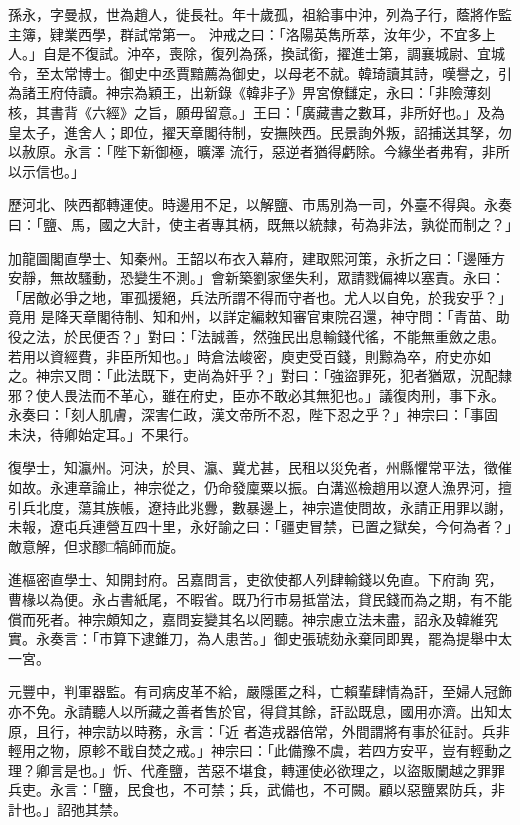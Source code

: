 \begin{pinyinscope}
 孫永，字曼叔，世為趙人，徙長社。年十歲孤，祖給事中沖，列為子行，蔭將作監主簿，肄業西學，群試常第一。
 沖戒之曰：「洛陽英雋所萃，汝年少，不宜多上人。」自是不復試。沖卒，喪除，復列為孫，換試銜，擢進士第，調襄城尉、宜城令，至太常博士。御史中丞賈黯薦為御史，以母老不就。韓琦讀其詩，嘆譽之，引為諸王府侍讀。神宗為穎王，出新錄《韓非子》畀宮僚讎定，永曰：「非險薄刻核，其書背《六經》之旨，願毋留意。」王曰：「廣藏書之數耳，非所好也。」及為皇太子，進舍人；即位，擢天章閣待制，安撫陜西。民景詢外叛，詔捕送其孥，勿以赦原。永言：「陛下新御極，曠澤
 流行，惡逆者猶得虧除。今緣坐者弗宥，非所以示信也。」



 歷河北、陜西都轉運使。時邊用不足，以解鹽、市馬別為一司，外臺不得與。永奏曰：「鹽、馬，國之大計，使主者專其柄，既無以統隸，茍為非法，孰從而制之？」



 加龍圖閣直學士、知秦州。王韶以布衣入幕府，建取熙河策，永折之曰：「邊陲方安靜，無故騷動，恐變生不測。」會新築劉家堡失利，眾請戮偏裨以塞責。永曰：「居敵必爭之地，軍孤援絕，兵法所謂不得而守者也。尤人以自免，於我安乎？」竟用
 是降天章閣待制、知和州，以詳定編敕知審官東院召還，神守問：「青苗、助役之法，於民便否？」對曰：「法誠善，然強民出息輸錢代徭，不能無重斂之患。若用以資經費，非臣所知也。」時倉法峻密，庾吏受百錢，則黥為卒，府史亦如之。神宗又問：「此法既下，吏尚為奸乎？」對曰：「強盜罪死，犯者猶眾，況配隸邪？使人畏法而不革心，雖在府史，臣亦不敢必其無犯也。」議復肉刑，事下永。永奏曰：「刻人肌膚，深害仁政，漢文帝所不忍，陛下忍之乎？」神宗曰：「事固
 未決，待卿始定耳。」不果行。



 復學士，知瀛州。河決，於貝、瀛、冀尤甚，民租以災免者，州縣懼常平法，徵催如故。永連章論止，神宗從之，仍命發廩粟以振。白溝巡檢趙用以遼人漁界河，擅引兵北度，蕩其族帳，遼持此兆釁，數暴邊上，神宗遣使問故，永請正用罪以謝，未報，遼屯兵連營互四十里，永好諭之曰：「疆吏冒禁，已置之獄矣，今何為者？」敵意解，但求醪□犒師而旋。



 進樞密直學士、知開封府。呂嘉問言，吏欲使都人列肆輸錢以免直。下府詢
 究，曹椽以為便。永占書紙尾，不暇省。既乃行市易抵當法，貸民錢而為之期，有不能償而死者。神宗頗知之，嘉問妄變其名以罔聽。神宗慮立法未盡，詔永及韓維究實。永奏言：「市算下逮錐刀，為人患苦。」御史張琥劾永棄同即異，罷為提舉中太一宮。



 元豐中，判軍器監。有司病皮革不給，嚴隱匿之科，亡賴輩肆情為訐，至婦人冠飾亦不免。永請聽人以所藏之善者售於官，得貸其餘，訐訟既息，國用亦濟。出知太原，且行，神宗訪以時務，永言：「近
 者造戎器倍常，外間謂將有事於征討。兵非輕用之物，原軫不戢自焚之戒。」神宗曰：「此備豫不虞，若四方安平，豈有輕動之理？卿言是也。」忻、代產鹽，苦惡不堪食，轉運使必欲理之，以盜販闌越之罪罪兵吏。永言：「鹽，民食也，不可禁；兵，武備也，不可闕。顧以惡鹽累防兵，非計也。」詔弛其禁。




\end{pinyinscope}
